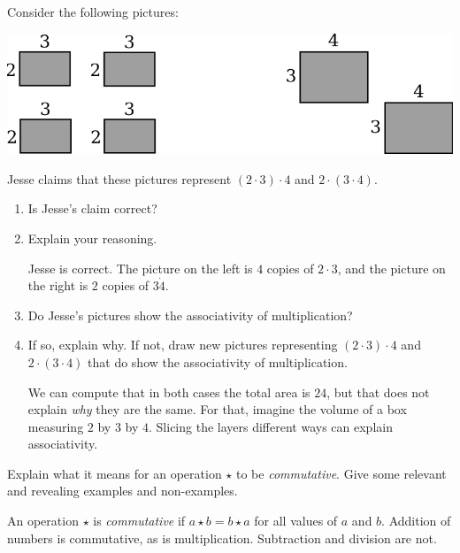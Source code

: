 \documentclass[nooutcomes]{ximera}
\begin{document}
\begin{problem}Consider the following pictures:
\begin{image}
\includegraphics{assMult.png}
\end{image}
Jesse claims that these pictures represent $(2\cdot 3)\cdot 4$ and
$2\cdot (3\cdot 4)$.
\begin{enumerate}
\item Is Jesse's claim correct? 
\begin{multipleChoice}
\end{multipleChoice}
\item Explain your reasoning.
\begin{freeResponse}
\begin{hint}
Jesse is correct.  The picture on the left is $4$ copies of $2\cdot 3$, and the picture on the right is $2$ copies of $3\dot 4$.  
\end{hint}
\end{freeResponse}
\item Do Jesse's pictures show the associativity of multiplication? 
\begin{multipleChoice}
\end{multipleChoice}
\item If so, explain why. If not, draw new pictures representing $(2\cdot
  3)\cdot 4$ and $2\cdot (3\cdot 4)$ that do show the associativity
  of multiplication.
\begin{freeResponse}
\begin{hint}
We can compute that in both cases the total area is $24$, but that does not explain \textit{why} they are the same.  For that, imagine the volume of a box measuring $2$ by $3$ by $4$.  Slicing the layers different ways can explain associativity.  
\end{hint}
\end{freeResponse}
\end{enumerate}
\end{problem} 

\begin{problem}Explain what it means for an operation $\star$ to be
  \textit{commutative}. Give some relevant and revealing examples  and non-examples.
\begin{freeResponse}
\begin{hint}
An operation $\star$ is \textit{commutative} if $a\star b = b\star a$ for all values of $a$ and $b$.  Addition of numbers is commutative, as is multiplication.  Subtraction and division are not.  
\end{hint}
\end{freeResponse}
\end{problem} 
\end{document}
